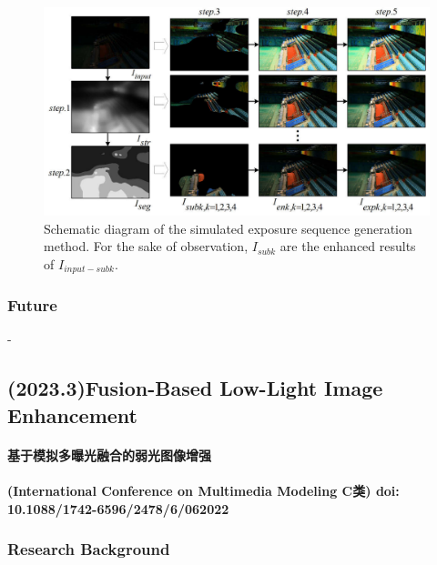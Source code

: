 \documentclass[a4paper, 10pt]{article}
\begin{document}
			\begin{figure}[htbp]
				\centering 
				\includegraphics[width=\columnwidth]{picture/LLIE/Multi-exposure fusion/Schematic diagram}
				\caption{
					\label{fig: Schematic diagram} 
					Schematic diagram of the simulated exposure sequence generation method. For the sake of observation, $I_{subk}$ are the enhanced results of $I_{input-subk}$.
					}
			\end{figure}
			
			\subsubsection{Future}
			
			-
			
		\subsection{(2023.3)Fusion-Based Low-Light Image Enhancement}
		
		\paragraph{基于模拟多曝光融合的弱光图像增强}
		
		\paragraph{(International Conference on Multimedia Modeling C类) doi: 10.1088/1742-6596/2478/6/062022}
		
			\subsubsection{Research Background}
			
\end{document}
